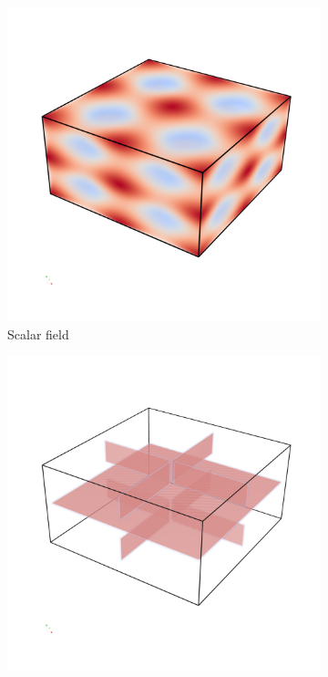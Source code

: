 \begin{figure}[t]
    \begin{subfigure}[b]{0.49\textwidth}
        \includegraphics[trim=0 350 0 300, clip=true, width=\textwidth]{Images/sfield.png}
        \caption{Scalar field}
        \label{fig:sfield}
    \end{subfigure}
    \begin{subfigure}[b]{0.49\textwidth}
        \includegraphics[trim=0 350 0 300, clip=true, width=\textwidth]{Images/ridge.png}

\end{subfigure}
\end{figure}

